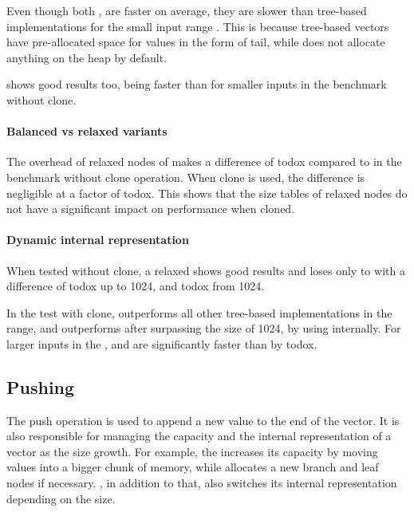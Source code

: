 Even though both \stdvec{}, \pvec{} are faster on average, they are slower than tree-based implementations for the small input range \range{[10, 100]}. This is because tree-based vectors have pre-allocated space for values in the form of tail, while \stdvec{} does not allocate anything on the heap by default. 

\imrsvec{} shows good results too, being faster than \rrbvec{} for smaller inputs in the benchmark without clone. 

\paragraph{Balanced vs relaxed variants}
The overhead of relaxed nodes of \rrbtree{} makes a difference of todox compared to \rbtree{} in the benchmark without clone operation. When clone is used, the difference is negligible at a factor of todox. This shows that the size tables of relaxed nodes do not have a significant impact on performance when cloned. 

\paragraph{Dynamic internal representation}
When tested without clone, a relaxed \pvec{} shows good results and loses only to \stdvec{} with a difference of todox up to 1024, and todox from 1024. 

In the test with clone, \pvec{} outperforms all other tree-based implementations in the \range{[100, \kilo{1}]} range, and outperforms \stdvec{} after surpassing the size of 1024, by using \rrbvec{} internally. For larger inputs in the , \pvec{} and \rrbvec{} are significantly faster than \stdvec{} by todox. 


\subsection{Pushing}

The push operation is used to append a new value to the end of the vector. It is also responsible for managing the capacity and the internal representation of a vector as the size growth. For example, the \stdvec{} increases its capacity by moving values into a bigger chunk of memory, while \rrbvec{} allocates a new branch and leaf nodes if necessary. \pvec{}, in addition to that, also switches its internal representation depending on the size.

